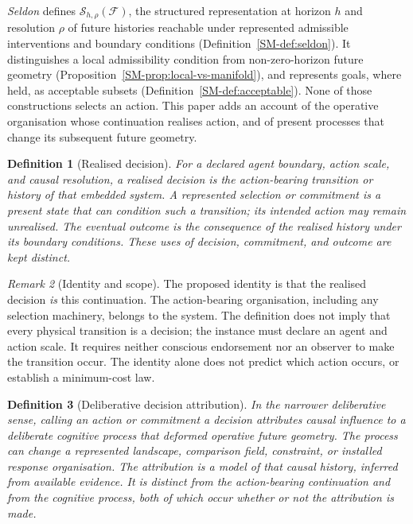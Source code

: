 \documentclass[11pt,a4paper]{article}
\newtheorem{definition}{Definition}[section]
\theoremstyle{remark}
\newtheorem{remark}[definition]{Remark}
\newcommand{\Frame}{\mathcal F}
\newcommand{\Seldon}{\mathcal S}
\begin{document}
\emph{Seldon} defines \(\Seldon_{h,\rho}(\Frame)\), the structured representation
at horizon \(h\) and resolution \(\rho\) of future histories reachable under
represented admissible interventions and boundary conditions
(Definition~\ref{SM-def:seldon}). It distinguishes a local admissibility
condition from non-zero-horizon future geometry
(Proposition~\ref{SM-prop:local-vs-manifold}), and represents goals, where
held, as acceptable subsets (Definition~\ref{SM-def:acceptable}). None of
those constructions selects an action. This paper adds an account of the
operative organisation whose continuation realises action, and of present
processes that change its subsequent future geometry.

\begin{definition}[Realised decision]\label{def:realised-decision}
For a declared agent boundary, action scale, and causal resolution, a realised
decision is the action-bearing transition or history of that embedded system.
A represented selection or commitment is a present state that can condition
such a transition; its intended action may remain unrealised. The eventual
outcome is the consequence of the realised history under its boundary
conditions. These uses of decision, commitment, and outcome are kept distinct.
\end{definition}

\begin{remark}[Identity and scope]\label{rem:identity}
The proposed identity is that the realised decision \emph{is} this
continuation. The action-bearing organisation, including any selection
machinery, belongs to the system. The definition does not imply that every
physical transition is a decision; the instance must declare an agent and
action scale. It requires neither conscious endorsement nor an observer to
make the transition occur. The identity alone does not predict which action
occurs, or establish a minimum-cost law.
\end{remark}

\begin{definition}[Deliberative decision attribution]\label{def:decision-attribution}
In the narrower deliberative sense, calling an action or commitment a
decision attributes causal influence to a deliberate cognitive process that
deformed operative future geometry. The process can change a represented
landscape, comparison field, constraint, or installed response organisation.
The attribution is a model of that causal history, inferred from available
evidence. It is distinct from the action-bearing continuation and from the
cognitive process, both of which occur whether or not the attribution is made.
\end{definition}
\end{document}

